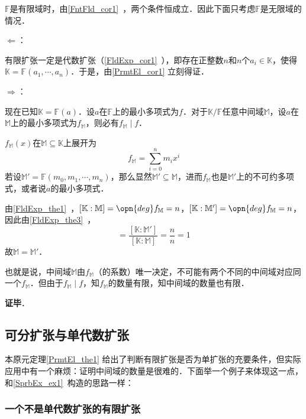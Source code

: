 $\mathbb{F}$是有限域时，由\autoref{FntFld_cor1}~，两个条件恒成立．因此下面只考虑$\mathbb{F}$是无限域的情况．

$\Leftarrow$：

有限扩张一定是代数扩张（\autoref{FldExp_cor1}~），即存在正整数$n$和$n$个$a_i\in\mathbb{K}$，使得$\mathbb{K}=\mathbb{F}(a_1, \cdots, a_n)$．于是，由\autoref{PrmtEl_cor1} 立刻得证．

$\Rightarrow$：

现在已知$\mathbb{K}=\mathbb{F}(a)$．设$a$在$\mathbb{F}$上的最小多项式为$f$．对于$\mathbb{K}/\mathbb{F}$任意中间域$\mathbb{M}$，设$a$在$\mathbb{M}$上的最小多项式为$f_\mathbb{M}$，则必有$f_{\mathbb{M}}\mid f$．

$f_\mathbb{M}(x)$在$\mathbb{M}\subseteq\mathbb{K}$上展开为
\begin{equation}
f_\mathbb{M} = \sum_{i=0}^n m_ix^i
\end{equation}
若设$\mathbb{M}'=\mathbb{F}(m_0, m_1, \cdots, m_n)$，那么显然$\mathbb{M}'\subseteq\mathbb{M}$，进而$f_\mathbb{M}$也是$\mathbb{M}'$上的不可约多项式，或者说$a$的最小多项式．

由\autoref{FldExp_the1}~，$[\mathbb{K}:\mathbb{M}]=\opn{deg}f_\mathbb{M}=n$，$[\mathbb{K}:\mathbb{M}']=\opn{deg}f_\mathbb{M}=n$，因此由\autoref{FldExp_the3}~，
\begin{equation}
[\mathbb{M}:\mathbb{M}']=\frac{[\mathbb{K}:\mathbb{M}']}{[\mathbb{K}:\mathbb{M}]}=\frac{n}{n}=1
\end{equation}
故$\mathbb{M}=\mathbb{M}'$．

也就是说，中间域$\mathbb{M}$由$f_\mathbb{M}$（的系数）唯一决定，不可能有两个不同的中间域对应同一个$f_{\mathbb{M}}$．但由于$f_\mathbb{M}\mid f$，知$f_\mathbb{M}$的数量有限，知中间域的数量也有限．

\textbf{证毕}．


\subsection{可分扩张与单代数扩张}



本原元定理\autoref{PrmtEl_the1} 给出了判断有限扩张是否为单扩张的充要条件，但实际应用中有一个麻烦：证明中间域的数量是很难的．下面举一个例子来体现这一点，和\autoref{SprbEx_ex1}~构造的思路一样：

\subsubsection{一个不是单代数扩张的有限扩张}

